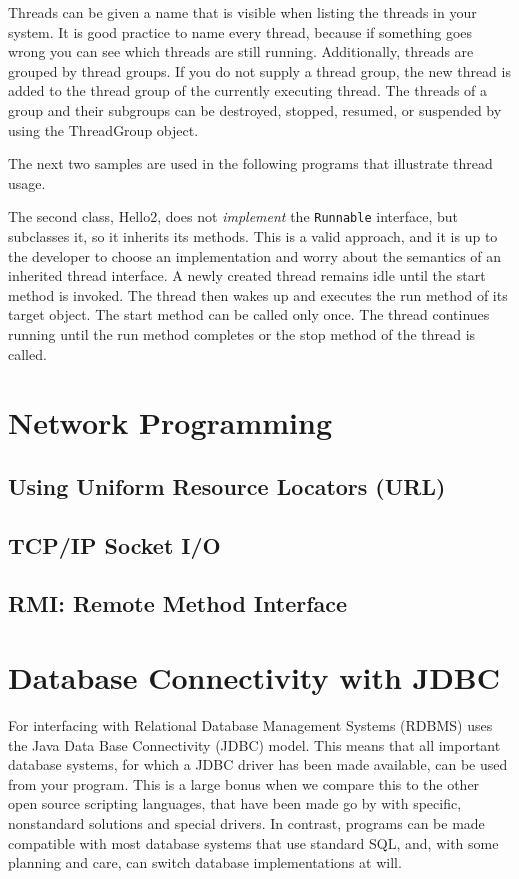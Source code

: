 {{Threads can be given a name that is visible when listing the threads in your system. It is good practice to name every thread, because if something goes wrong you can see which threads are still running.
Additionally, threads are grouped by thread groups. If you do not
supply a thread group, the new thread is added to the thread group of
the currently executing thread. The threads of a group and their
subgroups can be destroyed, stopped, resumed, or suspended by using
the ThreadGroup object. 

The next two samples are used in the following programs that
illustrate thread usage.
 
 
The second class, Hello2, does not \emph{implement} the
\texttt{Runnable} interface, but subclasses it, so it inherits its
methods. This is a valid approach, and it is up to the developer to
choose an implementation and worry about the semantics of an inherited
thread interface.
A newly created thread remains idle until the start method is invoked. The thread then wakes up and executes the run method of its target object. The start method can be called only once. The thread continues running until the run method completes or the stop method of the thread is called.



\chapter{Network Programming}
\section{Using Uniform Resource Locators (URL)}
\section{TCP/IP Socket I/O}
\section{RMI: Remote Method Interface}

\chapter{Database Connectivity with JDBC}
For interfacing with Relational Database Management Systems (RDBMS)
\nr{} uses the Java Data Base Connectivity (JDBC) model. This means
that all important database systems, for which a JDBC driver has
been made available, can be used from your \nr{} program. This is a
large bonus when we compare this to the other open source scripting
languages, that have been made go by with specific, nonstandard
solutions and special drivers. In contrast, \nr{} programs can be
made compatible with most database systems that use standard SQL, and,
with some planning and care, can switch database implementations at
will.
 

}}
